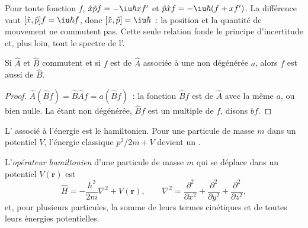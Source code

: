 \begin{example}\label{ex:b3:quantum-model-systems:canonical}
Pour toute fonction $f$, $\hat x\hat pf = -\iu\hbar xf'$ et $\hat p\hat xf =
-\iu\hbar(f + xf')$. La différence vaut $[\hat x,\hat p]f = \iu\hbar f$, donc
$[\hat x,\hat p] = \iu\hbar$~: la position et la quantité de mouvement ne
commutent pas. Cette seule relation fonde le principe d'incertitude et,
plus loin, tout le spectre de l'.
\end{example}

\begin{proposition}\label{prop:b3:quantum-model-systems:commuting}
Si $\hat A$ et $\hat B$ commutent et si $f$ est  de $\hat A$
associée à une  non dégénérée $a$, alors $f$ est aussi
 de $\hat B$.
\end{proposition}

\begin{proof}
$\hat A(\hat Bf) = \hat B\hat Af = a(\hat Bf)$~: la fonction $\hat Bf$ est
 de $\hat A$ avec la même  $a$, ou bien nulle.
La  étant non dégénérée, $\hat Bf$ est un multiple de $f$,
disons $bf$.
\end{proof}

L' associé à l'énergie est le hamiltonien. Pour une particule de
masse $m$ dans un potentiel $V$, l'énergie classique $p^2/2m + V$ devient
un .

\begin{definition}\label{def:b3:quantum-model-systems:schrodinger}
L'\emph{opérateur hamiltonien} d'une particule de
masse $m$ qui se déplace dans un potentiel $V(\mathbf r)$ est
\[
\hat H = -\frac{\hbar^2}{2m}\nabla^2 + V(\mathbf r), \qquad \nabla^2 =
\frac{\partial^2}{\partial x^2} + \frac{\partial^2}{\partial y^2} +
\frac{\partial^2}{\partial z^2},
\]
et, pour plusieurs particules, la somme de leurs termes cinétiques et de
toutes leurs énergies potentielles.
\end{definition}

